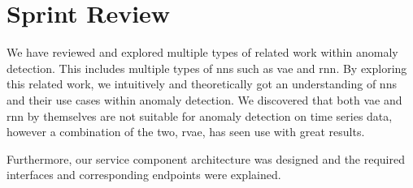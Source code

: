 \section{Sprint Review} \label{sprint_2_review}
We have reviewed and explored multiple types of related work within anomaly detection. This includes multiple types of \glspl{nn} such as \gls{vae} and \gls{rnn}. By exploring this related work, we intuitively and theoretically got an understanding of \glspl{nn} and their use cases within anomaly detection. We discovered that both \gls{vae} and \gls{rnn} by themselves are not suitable for anomaly detection on time series data, however a combination of the two, \gls{rvae}, has seen use with great results.

Furthermore, our service component architecture was designed and the required interfaces and corresponding \glspl{endpoint} were explained.
